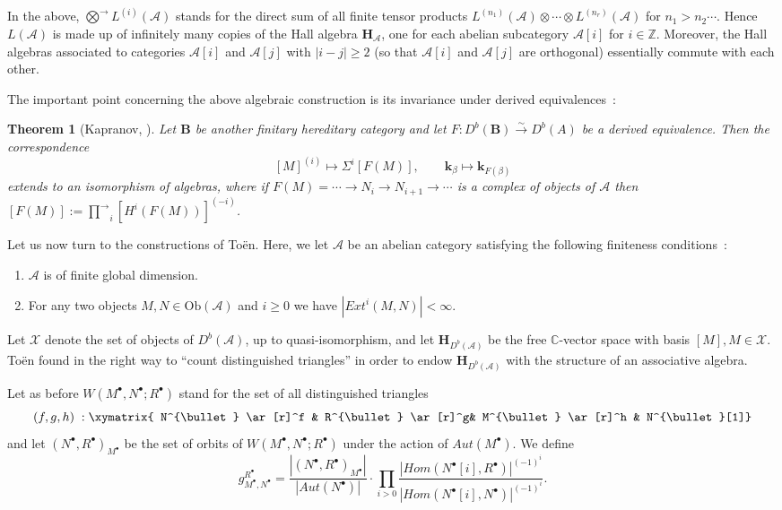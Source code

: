 \documentclass[a4paper,10pt]{amsart}
\def\Z{\mathbb{Z}}
\def\H{\mathbf{H}}
\def\C{\mathbb{C}}
\def\B{\mathbf{B}}
\def\A{\mathcal{A}}
\newtheorem{theo}{\bf{Theorem}}[section]
\numberwithin{equation}{section}
\begin{document}
{\vspace{.1in}

In the above, $\vec{\bigotimes} L^{(i)}(\A)$ stands for the direct sum of all finite tensor products
$L^{(n_1)}(\A) \otimes \cdots \otimes L^{(n_r)}(\A)$ for $n_1>n_2 \cdots$. Hence $L(\A)$ is made up of infinitely many copies of the Hall algebra $\H_{\A}$, one for each abelian subcategory $\A[i]$ for $i \in \Z$. Moreover, the Hall algebras associated to categories $\A[i]$ and $\A[j]$ with $|i-j| \geq 2$ (so that $\A[i]$ and $\A[j]$ are orthogonal) essentially commute with each other.

\vspace{.1in}

The important point concerning the above algebraic construction is its invariance under derived equivalences~:

\vspace{.1in}

\begin{theo}[Kapranov, \cite{Kap2}] Let $\B$ be another finitary hereditary category and let $F: D^b(\B) \stackrel{\sim}{\to} D^b(A)$ be a derived equivalence. Then the correspondence
$$[M]^{(i)} \mapsto \Sigma^i [F(M)], \qquad \mathbf{k}_{\beta} \mapsto \mathbf{k}_{F(\beta)}$$
extends to an isomorphism of algebras, where if $F(M)= \cdots \to N_i \to N_{i+1} \to \cdots$ is a complex of objects of $\A$ then $[F(M)]:=\vec{\prod}_i [H^i(F(M))]^{(-i)}$.
\end{theo}

\vspace{.2in}

Let us now turn to the constructions of To\"en. Here, we let $\A$ be an abelian category satisfying the following finiteness conditions~:
\begin{enumerate}
\item[i)] $\A$ is of finite global dimension.
\item[ii)]For any two objects $M,N \in \text{Ob}(\mathcal{A})$ and $i \geq 0$ we have $|{Ext}^i(M,N)| < \infty$.
\end{enumerate}

Let $\mathcal{X}$ denote the set of objects of $D^b(\A)$, up to quasi-isomorphism, and let $\H_{D^b(\A)}$ be the free $\C$-vector space with basis $[M], M \in \mathcal{X}$. To\"en found in \cite{Toen} the right way to ``count distinguished triangles'' in order to endow $\H_{D^b(\A)}$ with
the structure of an associative algebra.

Let as before $W(M^{\bullet},N^{\bullet};R^{\bullet})$ stand for the set of all distinguished triangles
$$(f,g,h)\;: \xymatrix{ N^{\bullet} \ar[r]^f & R^{\bullet} \ar[r]^g& M^{\bullet} \ar[r]^h & N^{\bullet}[1]}$$
and let $(N^{\bullet},R^{\bullet})_{M^{\bullet}}$ be the set of orbits of $W(M^{\bullet},N^{\bullet};R^{\bullet})$ under the action of $Aut(M^{\bullet})$. We define
$$g_{M^{\bullet},N^{\bullet}}^{R^{\bullet}}=
\frac{|(N^{\bullet},R^{\bullet})_{M^{\bullet}}|}{|Aut(N^{\bullet})|} \cdot \prod_{i >0}
\frac{|{Hom}(N^{\bullet}[i],R^{\bullet})|^{(-1)^i}}{|{Hom}(N^{\bullet}[i],N^{\bullet})|^{(-1)^i}}.$$

}
\end{document}

